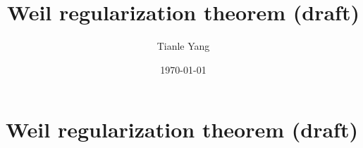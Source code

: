 \documentclass{noteformyself}
\title{Weil regularization theorem (draft)}
\author{Tianle Yang}
\date{\today}
\begin{document}
    \maketitle

    \section{Weil regularization theorem (draft)}


\end{document}
